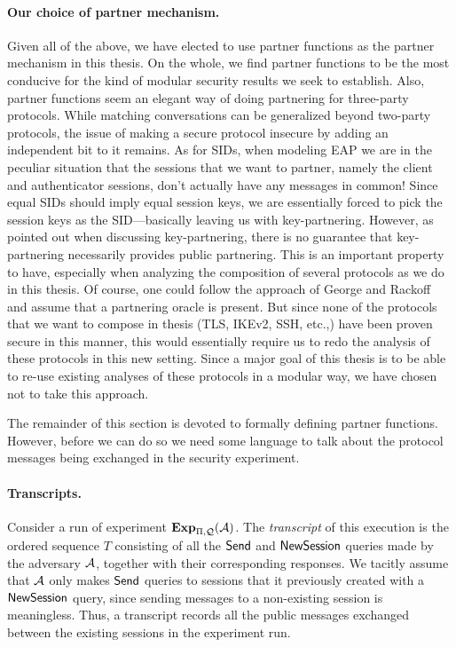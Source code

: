 \paragraph{Our choice of partner mechanism.}
Given all of the above,
we have elected to use partner functions as the partner mechanism in this thesis.
On the whole,
we find partner functions to be the most conducive for the kind of modular security results we seek to establish.
Also,
partner functions seem an elegant way of doing partnering for three-party protocols.
While matching conversations can be generalized beyond two-party protocols,
the issue of making a secure protocol insecure by adding an independent bit to it remains.
As for SIDs,
when modeling EAP we are in the peculiar situation that the sessions that we want to partner,
namely the client and authenticator sessions,
don't actually have any messages in common!
Since equal SIDs should imply equal session keys,
we are essentially forced to pick the session keys as the SID---basically leaving us with key-partnering.
However,
as pointed out when discussing key-partnering,
there is no guarantee that key-partnering necessarily provides public partnering.
This is an important property to have,
especially when analyzing the composition of several protocols as we do in this thesis.
Of course,
one could follow the approach of George and Rackoff~\cite{EPRINT:GeoRac13} and assume that a partnering oracle is present.
But since none of the protocols that we want to compose in thesis (TLS, IKEv2, SSH, etc.,) have been proven secure in this manner,
this would essentially require us to redo the analysis of these protocols in this new setting.
Since a major goal of this thesis is to be able to re-use existing analyses of these protocols in a modular way,
we have chosen not to take this approach.


The remainder of this section is devoted to formally defining partner functions.
However,
before we can do so we need some language to talk about the protocol messages being exchanged in the security experiment.


\paragraph{Transcripts.}
Consider a run of experiment $\mathbf{Exp}_{\mathrm{\Pi},\mathcal{Q}}^{}(\mathcal{A})$.
The \emph{transcript} of this execution is the ordered sequence $T$ consisting of all the $\mathsf{Send}$ and $\mathsf{NewSession}$ queries made by the adversary $\mathcal{A}$,
together with their corresponding responses.
We tacitly assume that $\mathcal{A}$ only makes $\mathsf{Send}$ queries to sessions that it previously created with a $\mathsf{NewSession}$ query,
since sending messages to a non-existing session is meaningless.
Thus,
a transcript records all the public messages exchanged between the existing sessions in the experiment run. 

